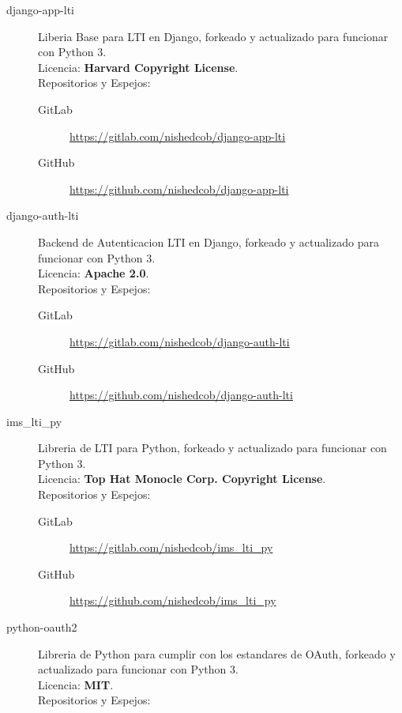 \begin{description}
\begin{description}
\begin{description}
        	\item[django-app-lti] Liberia Base para LTI en Django, forkeado y actualizado para funcionar con Python 3.\\
            Licencia: \textbf{Harvard Copyright License}. \\
            Repositorios y Espejos:
            \begin{description}
                \item[GitLab] \sloppy \url{https://gitlab.com/nishedcob/django-app-lti}
                \item[GitHub] \sloppy \url{https://github.com/nishedcob/django-app-lti}
            \end{description}
            \item[django-auth-lti] Backend de Autenticacion LTI en Django, forkeado y actualizado para funcionar con Python 3.\\
            Licencia: \textbf{Apache 2.0}. \\
            Repositorios y Espejos:
            \begin{description}
                \item[GitLab] \sloppy \url{https://gitlab.com/nishedcob/django-auth-lti}
                \item[GitHub] \sloppy \url{https://github.com/nishedcob/django-auth-lti}
            \end{description}
            \item[ims\_lti\_py] Libreria de LTI para Python, forkeado y actualizado para funcionar con Python 3.\\
            Licencia: \textbf{Top Hat Monocle Corp. Copyright License}. \\
            Repositorios y Espejos:
            \begin{description}
                \item[GitLab] \sloppy \url{https://gitlab.com/nishedcob/ims_lti_py}
                \item[GitHub] \sloppy \url{https://github.com/nishedcob/ims_lti_py}
            \end{description}
            \item[python-oauth2] Libreria de Python para cumplir con los estandares de OAuth, forkeado y actualizado para funcionar con Python 3.
            \\
            Licencia: \textbf{MIT}. \\
            Repositorios y Espejos:
            \begin{description}

\end{description}
\end{description}
\end{description}
\end{description}

